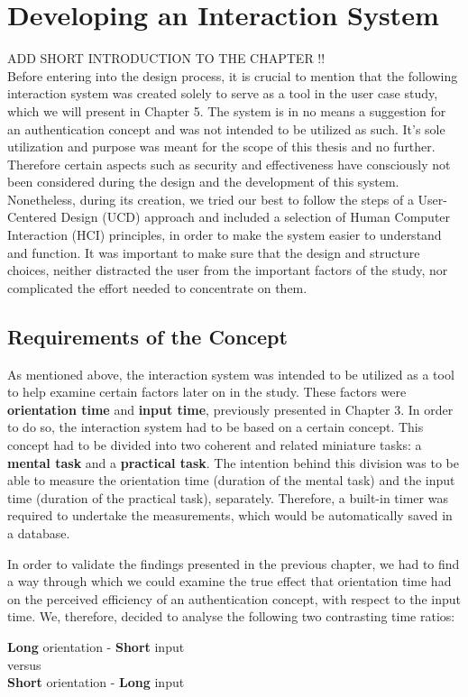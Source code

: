 
\chapter{Developing an Interaction System}\label{ch:forth}
ADD SHORT INTRODUCTION TO THE CHAPTER !!\\

Before entering into the design process, it is crucial to mention that the following interaction system was created solely to serve as a tool in the user case study, which we will present in Chapter 5. The system is in no means a suggestion for an authentication concept and was not intended to be utilized as such. It's sole utilization and purpose was meant for the scope of this thesis and no further. Therefore certain aspects such as security and effectiveness have consciously not been considered during the design and the development of this system. Nonetheless, during its creation, we tried our best to follow the steps of a User-Centered Design (UCD) approach and included a selection of Human Computer Interaction (HCI) principles, in order to make the system easier to understand and function. It was important to make sure that the design and structure choices, neither distracted the user from the important factors of the study, nor complicated the effort needed to concentrate on them.  


\section{Requirements of the Concept}
As mentioned above, the interaction system was intended to be utilized as a tool to help examine certain factors later on in the study. These factors were \textbf{orientation time} and \textbf{input time}, previously presented in Chapter 3. In order to do so, the interaction system had to be based on a certain concept. This concept had to be divided into two coherent and related miniature tasks: a \textbf{mental task} and a \textbf{practical task}. The intention behind this division was to be able to measure the orientation time (duration of the mental task) and the input time (duration of the practical task), separately. Therefore, a built-in timer was required to undertake the measurements, which would be automatically saved in a database. 

In order to validate the findings presented in the previous chapter, we had to find a way through which we could examine the true effect that orientation time had on the perceived efficiency of an authentication concept, with respect to the input time. We, therefore, decided to analyse the following two contrasting time ratios: 
\begin{center}
    \textbf{Long} orientation - \textbf{Short} input \\
    versus \\
    \textbf{Short} orientation - \textbf{Long} input
\end{center} 


